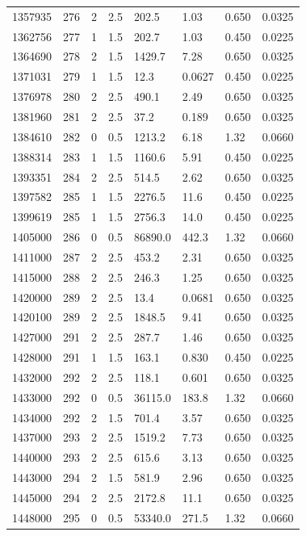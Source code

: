 \documentclass[preview]{standalone}
\begin{document}
{{{{{{{{{\begin{tabular}{L{1.2cm}C{1.2cm} C{0.3cm}C{0.5cm} C{1.4cm}C{1.4cm} C{1.4cm}C{1.4cm}}
  1357935  &   276  & 2     & 2.5 &  202.5  & 1.03  & 0.650 &  0.0325   \\ 
  1362756  &   277  & 1     & 1.5 &  202.7  & 1.03  & 0.450 &  0.0225   \\ 
  1364690  &   278  & 2     & 1.5 &  1429.7  & 7.28  & 0.650 &  0.0325   \\ 
  1371031  &   279  & 1     & 1.5 &  12.3  & 0.0627  & 0.450 &  0.0225   \\ 
  1376978  &   280  & 2     & 2.5 &  490.1  & 2.49  & 0.650 &  0.0325   \\ 
  1381960  &   281  & 2     & 2.5 &  37.2  & 0.189  & 0.650 &  0.0325   \\ 
  1384610  &   282  & 0     & 0.5 &  1213.2  & 6.18  & 1.32 &  0.0660   \\ 
  1388314  &   283  & 1     & 1.5 &  1160.6  & 5.91  & 0.450 &  0.0225   \\ 
  1393351  &   284  & 2     & 2.5 &  514.5  & 2.62  & 0.650 &  0.0325   \\ 
  1397582  &   285  & 1     & 1.5 &  2276.5  & 11.6  & 0.450 &  0.0225   \\ 
  1399619  &   285  & 1     & 1.5 &  2756.3  & 14.0  & 0.450 &  0.0225   \\ 
  1405000  &   286  & 0     & 0.5 &  86890.0  & 442.3  & 1.32 &  0.0660   \\ 
  1411000  &   287  & 2     & 2.5 &  453.2  & 2.31  & 0.650 &  0.0325   \\ 
  1415000  &   288  & 2     & 2.5 &  246.3  & 1.25  & 0.650 &  0.0325   \\ 
  1420000  &   289  & 2     & 2.5 &  13.4  & 0.0681  & 0.650 &  0.0325   \\ 
  1420100  &   289  & 2     & 2.5 &  1848.5  & 9.41  & 0.650 &  0.0325   \\ 
  1427000  &   291  & 2     & 2.5 &  287.7  & 1.46  & 0.650 &  0.0325   \\ 
  1428000  &   291  & 1     & 1.5 &  163.1  & 0.830  & 0.450 &  0.0225   \\ 
  1432000  &   292  & 2     & 2.5 &  118.1  & 0.601  & 0.650 &  0.0325   \\ 
  1433000  &   292  & 0     & 0.5 &  36115.0  & 183.8  & 1.32 &  0.0660   \\ 
  1434000  &   292  & 2     & 1.5 &  701.4  & 3.57  & 0.650 &  0.0325   \\ 
  1437000  &   293  & 2     & 2.5 &  1519.2  & 7.73  & 0.650 &  0.0325   \\ 
  1440000  &   293  & 2     & 2.5 &  615.6  & 3.13  & 0.650 &  0.0325   \\ 
  1443000  &   294  & 2     & 1.5 &  581.9  & 2.96  & 0.650 &  0.0325   \\ 
  1445000  &   294  & 2     & 2.5 &  2172.8  & 11.1  & 0.650 &  0.0325   \\ 
  1448000  &   295  & 0     & 0.5 &  53340.0  & 271.5  & 1.32 &  0.0660   \\ 
\hline 
\end{tabular} 

}}}}}}}}}
\end{document}
